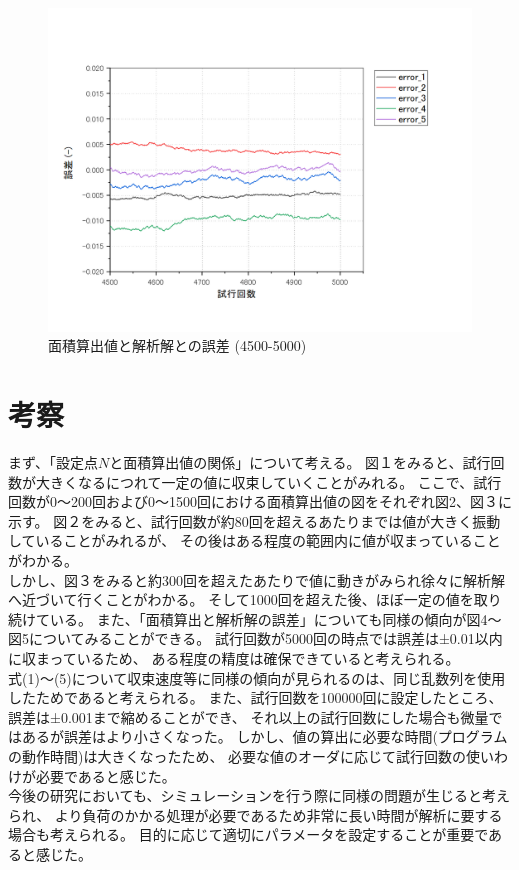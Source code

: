 \documentclass[12pt,a4paper]{jsarticle}
\begin{document}
\begin{figure}[htbp]
    \begin{center}
        \includegraphics[width=150mm]{Graph/error_4500-5000.png}
        \caption{面積算出値と解析解との誤差 (4500-5000)}
    \end{center}
\end{figure}

\newpage
\section{考察}
まず、「設定点$N$と面積算出値の関係」について考える。
図１をみると、試行回数が大きくなるにつれて一定の値に収束していくことがみれる。
ここで、試行回数が0〜200回および0〜1500回における面積算出値の図をそれぞれ図2、図３に示す。
図２をみると、試行回数が約80回を超えるあたりまでは値が大きく振動していることがみれるが、
その後はある程度の範囲内に値が収まっていることがわかる。\\
しかし、図３をみると約300回を超えたあたりで値に動きがみられ徐々に解析解へ近づいて行くことがわかる。
そして1000回を超えた後、ほぼ一定の値を取り続けている。
また、「面積算出と解析解の誤差」についても同様の傾向が図4〜図5についてみることができる。
試行回数が5000回の時点では誤差は±0.01以内に収まっているため、
ある程度の精度は確保できていると考えられる。\\
式(1)〜(5)について収束速度等に同様の傾向が見られるのは、同じ乱数列を使用したためであると考えられる。
また、試行回数を100000回に設定したところ、誤差は±0.001まで縮めることができ、
それ以上の試行回数にした場合も微量ではあるが誤差はより小さくなった。
しかし、値の算出に必要な時間(プログラムの動作時間)は大きくなったため、
必要な値のオーダに応じて試行回数の使いわけが必要であると感じた。\\
今後の研究においても、シミュレーションを行う際に同様の問題が生じると考えられ、
より負荷のかかる処理が必要であるため非常に長い時間が解析に要する場合も考えられる。
目的に応じて適切にパラメータを設定することが重要であると感じた。
\end{document}
